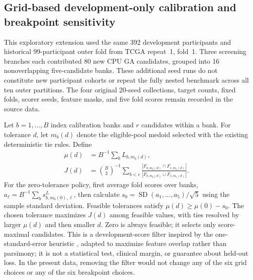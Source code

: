 \subsection{Grid-based development-only calibration and breakpoint sensitivity}
\label{sec:supp-calibration}

This exploratory extension used the same 392 development participants and historical 99-participant outer fold from TCGA repeat~1, fold~1. Three screening branches each contributed 80 new CPU GA candidates, grouped into 16 nonoverlapping five-candidate banks. These additional seed runs do not constitute new participant cohorts or repeat the fully nested benchmark across all ten outer partitions. The four original 20-seed collections, target counts, fixed folds, scorer seeds, feature masks, and five fold scores remain recorded in the source data.

Let $b=1,\ldots,B$ index calibration banks and $r$ candidates within a bank. For tolerance $d$, let $m_b(d)$ denote the eligible-pool medoid selected with the existing deterministic tie rules. Define
\begin{align}
\mu(d)&=B^{-1}\sum_b L_{b,m_b(d)},\\
J(d)&=\binom{B}{2}^{-1}\sum_{b<c}\frac{|F_{b,m_b(d)}\cap F_{c,m_c(d)}|}{|F_{b,m_b(d)}\cup F_{c,m_c(d)}|}.
\end{align}
For the zero-tolerance policy, first average fold scores over banks, $a_\ell=B^{-1}\sum_b s^L_{b,m_b(0),\ell}$, then calculate $s_0=\operatorname{SD}(a_1,\ldots,a_5)/\sqrt{5}$ using the sample standard deviation. Feasible tolerances satisfy $\mu(d)\geq\mu(0)-s_0$. The chosen tolerance maximizes $J(d)$ among feasible values, with ties resolved by larger $\mu(d)$ and then smaller $d$. Zero is always feasible; it selects only score-maximal candidates. This is a development-score filter inspired by the one-standard-error heuristic \citep{ref53}, adapted to maximize feature overlap rather than parsimony; it is not a statistical test, clinical margin, or guarantee about held-out loss. In the present data, removing the filter would not change any of the six grid choices or any of the six breakpoint choices.

